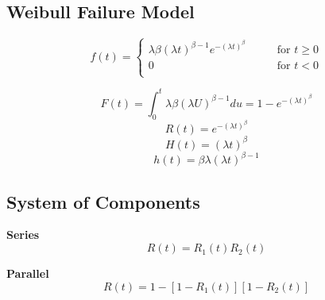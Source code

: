 \subsection{Weibull Failure Model} %
\label{sub:weibull_failure_model}
\begin{equation}
  f(t) = \begin{cases}
    \lambda \beta(\lambda t)^{\beta-1}e^{-(\lambda t)^\beta} \qquad &\text{for } t \geq 0 \\
    0 \qquad &\text{for } t < 0 \\
  \end{cases}
\end{equation}
\begin{multicols}{2}
  \begin{equation}
    F(t) = \int^t_0 \lambda \beta(\lambda U)^{\beta-1}du = 1 - e^{-(\lambda t)^\beta}
  \end{equation}
  \begin{equation}
    R(t) = e^{-(\lambda t)^\beta}
  \end{equation}
  \begin{equation}
    H(t) = (\lambda t)^{\beta}
  \end{equation}
  \begin{equation}
    h(t) = \beta \lambda (\lambda t)^{\beta-1}
  \end{equation}
\end{multicols}

\subsection{System of Components} %
\label{sub:system_of_components}

\textbf{Series}
\begin{equation}
  R(t) = R_1(t)R_2(t)
\end{equation}

\textbf{Parallel}
\begin{equation}
  R(t) = 1 - [1- R_1(t)][1 - R_2(t)]
\end{equation}


